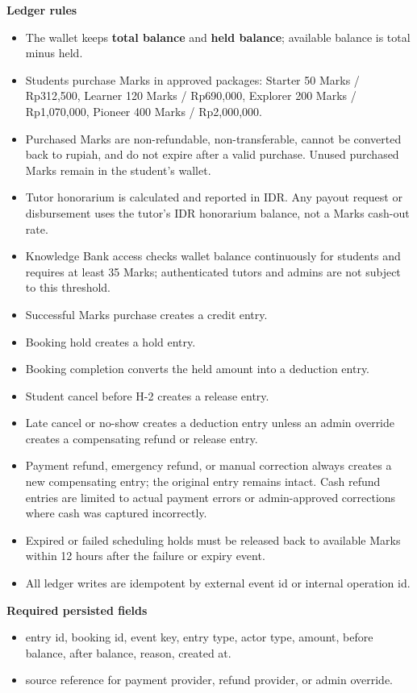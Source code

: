 \documentclass[11pt,a4paper]{article}
\begin{document}
\textbf{Ledger rules}
\begin{itemize}
	\item The wallet keeps \textbf{total balance} and \textbf{held balance}; available balance is total minus held.
	\item Students purchase Marks in approved packages: Starter 50 Marks / Rp312,500, Learner 120 Marks / Rp690,000, Explorer 200 Marks / Rp1,070,000, Pioneer 400 Marks / Rp2,000,000.
	\item Purchased Marks are non-refundable, non-transferable, cannot be converted back to rupiah, and do not expire after a valid purchase. Unused purchased Marks remain in the student's wallet.
	\item Tutor honorarium is calculated and reported in IDR. Any payout request or disbursement uses the tutor's IDR honorarium balance, not a Marks cash-out rate.
	\item Knowledge Bank access checks wallet balance continuously for students and requires at least 35 Marks; authenticated tutors and admins are not subject to this threshold.
	\item Successful Marks purchase creates a credit entry.
	\item Booking hold creates a hold entry.
	\item Booking completion converts the held amount into a deduction entry.
	\item Student cancel before H-2 creates a release entry.
	\item Late cancel or no-show creates a deduction entry unless an admin override creates a compensating refund or release entry.
	\item Payment refund, emergency refund, or manual correction always creates a new compensating entry; the original entry remains intact. Cash refund entries are limited to actual payment errors or admin-approved corrections where cash was captured incorrectly.
	\item Expired or failed scheduling holds must be released back to available Marks within 12 hours after the failure or expiry event.
	\item All ledger writes are idempotent by external event id or internal operation id.
\end{itemize}

\textbf{Required persisted fields}
\begin{itemize}
	\item entry id, booking id, event key, entry type, actor type, amount, before balance, after balance, reason, created at.
	\item source reference for payment provider, refund provider, or admin override.
\end{itemize}
\end{document}
